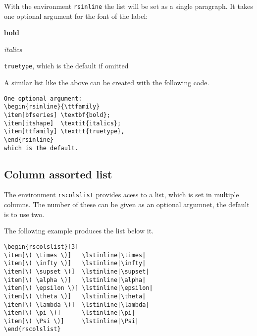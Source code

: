 \documentclass[   %
  final,          %
  a4paper,        %
  portrait,       %
  rscols=3,       %
  margin=1.0cm,   %
  titlepage,      %
]{refsheet}
\newcommand\mybackslash{\char`\\}
\begin{document}
With the environment \texttt{rsinline} the list will be
set as a single paragraph.
It takes one optional argument for the font of the label:
\begin{rsinline}%
\item[\mybackslash{}bfseries] \textbf{bold}
\item[\mybackslash{}itshape]  \textit{italics}
\item[\mybackslash{}ttfamily] \texttt{truetype}, which is the default if omitted%
\end{rsinline}

A similar list like the above can be created with the following code.

\begin{lstlisting}
One optional argument:
\begin{rsinline}{\ttfamily}
\item[bfseries] \textbf{bold};
\item[itshape]  \textit{italics};
\item[ttfamily] \texttt{truetype},
\end{rsinline}
which is the default.
\end{lstlisting}

\subsection{Column assorted list}

The environment \texttt{rscolslist} provides acess to a list, 
which is set in multiple columns.
The number of these can be given as an optional argumnet,
the default is to use two.

The following example produces the list below it.

\begin{lstlisting}
\begin{rscolslist}[3]
\item[\( \times \)]   \lstinline|\times| 
\item[\( \infty \)]   \lstinline|\infty| 
\item[\( \supset \)]  \lstinline|\supset|
\item[\( \alpha \)]   \lstinline|\alpha| 
\item[\( \epsilon \)] \lstinline|\epsilon|
\item[\( \theta \)]   \lstinline|\theta| 
\item[\( \lambda \)]  \lstinline|\lambda|
\item[\( \pi \)]      \lstinline|\pi| 
\item[\( \Psi \)]     \lstinline|\Psi|
\end{rscolslist}
\end{lstlisting}
\end{document}
